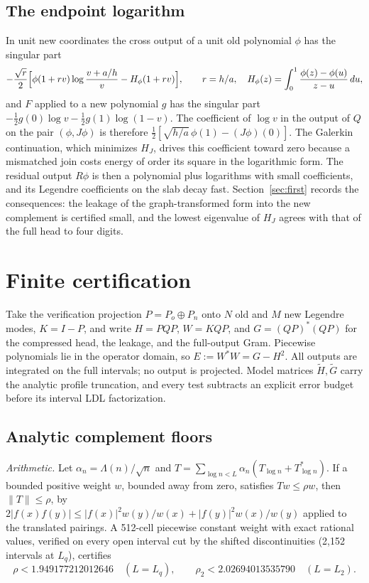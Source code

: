 \documentclass[11pt]{article}
\numberwithin{equation}{section}
\theoremstyle{definition}
\theoremstyle{remark}
\newcommand{\norm}[1]{\lVert#1\rVert}
\newcommand{\Lq}{L_q}
\newcommand{\Ltwo}{L_2}
\begin{document}
\subsection{The endpoint logarithm}\label{sec:endpointlog}
In unit new coordinates the cross output of a unit old polynomial $\phi$ has the singular part
\[
 -\frac{\sqrt r}2\Bigl[\phi(1+rv)\log\frac{v+a/h}{v}-H_\phi(1+rv)\Bigr],\qquad r=h/a,\quad H_\phi(z)=\int_0^1\frac{\phi(z)-\phi(u)}{z-u}\,du,
\]
and $F$ applied to a new polynomial $g$ has the singular part $-\tfrac12g(0)\log v-\tfrac12g(1)\log(1-v)$. The coefficient of $\log v$ in the output of $Q$ on the pair $(\phi,J\phi)$ is therefore $\tfrac12[\sqrt{h/a}\,\phi(1)-(J\phi)(0)]$. The Galerkin continuation, which minimizes $H_J$, drives this coefficient toward zero because a mismatched join costs energy of order its square in the logarithmic form. The residual output $R\phi$ is then a polynomial plus logarithms with small coefficients, and its Legendre coefficients on the slab decay fast. Section~\ref{sec:first} records the consequences: the leakage of the graph-transformed form into the new complement is certified small, and the lowest eigenvalue of $H_J$ agrees with that of the full head to four digits.

\section{Finite certification}\label{sec:certification}

Take the verification projection $P=P_o\oplus P_n$ onto $N$ old and $M$ new Legendre modes, $K=I-P$, and write $H=PQP$, $W=KQP$, and $G=(QP)^*(QP)$ for the compressed head, the leakage, and the full-output Gram. Piecewise polynomials lie in the operator domain, so $E:=W^*W=G-H^2$. All outputs are integrated on the full intervals; no output is projected. Model matrices $\widetilde H,\widetilde G$ carry the analytic profile truncation, and every test subtracts an explicit error budget before its interval LDL factorization.

\subsection{Analytic complement floors}\label{sec:complements}
\emph{Arithmetic.} Let $\alpha_n=\Lambda(n)/\sqrt n$ and $T=\sum_{\log n<L}\alpha_n(T_{\log n}+T_{\log n}^*)$. If a bounded positive weight $w$, bounded away from zero, satisfies $Tw\le\rho w$, then $\norm T\le\rho$, by $2|f(x)f(y)|\le|f(x)|^2w(y)/w(x)+|f(y)|^2w(x)/w(y)$ applied to the translated pairings. A 512-cell piecewise constant weight with exact rational values, verified on every open interval cut by the shifted discontinuities (2,152 intervals at $\Lq$), certifies
\begin{equation}\label{eq:rho}
 \rho<1.949177212012646\quad(L=\Lq),\qquad \rho_2<2.02694013535790\quad(L=\Ltwo).
\end{equation}
\end{document}
